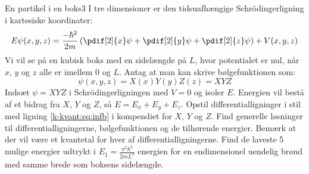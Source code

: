 %
\begin{opgave}{En partikel i en boks}{3}
I tre dimensioner er den tidsuafhængige Schrödingerligning i kartesiske koordinater:
$$
E\psi(x,y,z) = \frac{-\hbar^2}{2m}\left(\pdif[2]{x}\psi +\pdif[2]{y}\psi+\pdif[2]{z}\psi\right) + V(x,y,z)
$$
Vi vil se på en kubisk boks med en sidelængde på $L$, hvor potentialet er nul, når $x$, $y$ og $z$ alle er imellem 0 og $L$.
Antag at man kan skrive bølgefunktionen som:
$$
\psi(x,y,z) = X(x)Y(y)Z(z) = XYZ
$$
\opg Indsæt $\psi = XYZ$ i Schrödingerligningen med $V=0$ og isoler $E$.
\opg Energien vil bestå af et bidrag fra $X$, $Y$ og $Z$, så $E=E_x+E_y+E_z$. Opstil differentialligninger i stil med ligning \eqref{k-kvant:eq:infb} i kompendiet for $X$, $Y$ og $Z$.
\opg Find generelle løsninger til differentialligningerne, bølgefunktionen og de tilhørende energier. Bemærk at der vil være et kvantetal for hver af differentialligningerne. 
\opg Find de laveste 5 mulige energier udtrykt i $E_1 = \frac{\pi^2\hbar^2}{2mL^2}$ energien for en  endimensionel uendelig brønd med samme brede som boksens sidelængde.
\end{opgave}